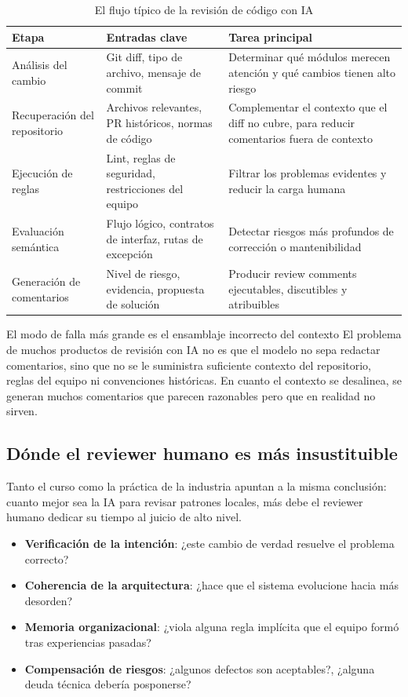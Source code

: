 \begin{table}[H]
\centering
\begin{tabular}{p{} p{} p{}}
\toprule
Etapa & Entradas clave & Tarea principal \\
\midrule
Análisis del cambio & Git diff, tipo de archivo, mensaje de commit & Determinar qué módulos merecen atención y qué cambios tienen alto riesgo \\
Recuperación del repositorio & Archivos relevantes, PR históricos, normas de código & Complementar el contexto que el diff no cubre, para reducir comentarios fuera de contexto \\
Ejecución de reglas & Lint, reglas de seguridad, restricciones del equipo & Filtrar los problemas evidentes y reducir la carga humana \\
Evaluación semántica & Flujo lógico, contratos de interfaz, rutas de excepción & Detectar riesgos más profundos de corrección o mantenibilidad \\
Generación de comentarios & Nivel de riesgo, evidencia, propuesta de solución & Producir review comments ejecutables, discutibles y atribuibles \\
\bottomrule
\end{tabular}
\caption{El flujo típico de la revisión de código con IA}
\end{table}

\begin{warningbox}{El modo de falla más grande es el ensamblaje incorrecto del contexto}
El problema de muchos productos de revisión con IA no es que el modelo no sepa redactar comentarios, sino que no se le suministra suficiente contexto del repositorio, reglas del equipo ni convenciones históricas. En cuanto el contexto se desalinea, se generan muchos comentarios que parecen razonables pero que en realidad no sirven.
\end{warningbox}

\subsection{Dónde el reviewer humano es más insustituible}

Tanto el curso como la práctica de la industria apuntan a la misma conclusión: cuanto mejor sea la IA para revisar patrones locales, más debe el reviewer humano dedicar su tiempo al juicio de alto nivel.

\begin{itemize}
    \item \textbf{Verificación de la intención}: ¿este cambio de verdad resuelve el problema correcto?
    \item \textbf{Coherencia de la arquitectura}: ¿hace que el sistema evolucione hacia más desorden?
    \item \textbf{Memoria organizacional}: ¿viola alguna regla implícita que el equipo formó tras experiencias pasadas?
    \item \textbf{Compensación de riesgos}: ¿algunos defectos son aceptables?, ¿alguna deuda técnica debería posponerse?
\end{itemize}

